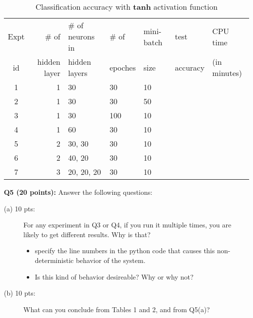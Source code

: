 \documentclass[11pt]{article}
\begin{document}
\begin{table}[h]
\centering
\caption{Classification accuracy with {\bf tanh} activation function}
\label{table1}
  \begin{tabular}{|c|r|l|l|l|l|l|} \hline
    Expt & \# of          & \# of neurons in & \# of    & mini-batch & test  & CPU time   \\  
    id   &  hidden layer  & hidden layers    & epoches & size       & accuracy  & (in minutes) \\ \hline

    1   &  1              &  30              &  30     &  10       &     & \\ \hline
    2   &  1              &  30              &  30     &  50       &     & \\ \hline
    3   &  1              &  30              &  100    &  10       &     &  \\ \hline
    4   &  1              &  60              &  30     &  10       &     & \\ \hline
    5   &  2              &  30, 30          &  30     &  10       &     & \\ \hline

    6   &  2              &  40, 20          &  30     &  10       &     & \\ \hline
    
    7   &  3              &  20, 20, 20      &  30     &  10       &     & \\ \hline
  \end{tabular}
\end{table}


           
\vspace{0.5 in}
\hspace{-0.3in}
{\bf Q5 (20 points):} Answer the following questions:

\begin{description}
\item [(a) 10 pts:] For any experiment in Q3 or Q4, if you run it multiple
  times, you are likely to get different results. Why is that?
  \begin{itemize}
  \item specify the line numbers in the python code that causes
        this non-deterministic behavior of the system. 
  \item Is this kind of behavior desireable? Why or why not?  
  \end{itemize}

\item [(b) 10 pts:] What can you conclude from Tables 1 and 2, and from
        Q5(a)?

\end{description}
           
\end{document}
